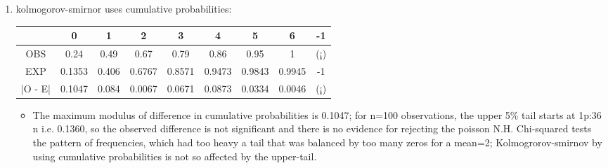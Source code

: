 \documentclass[a4paper,12pt]{article}
\begin{document}
\begin{enumerate}
\item kolmogorov-smirnor uses cumulative probabilities:

\begin{center}
\begin{tabular}{ccccccc|c|c}
	&	0	&	1	&	2	&	3	&	4	&	5	&	6	&	-1	\\ \hline
OBS 	&	0.24	&	0.49	&	0.67	&	0.79	&	0.86	&	0.95	&	1	&	(¡)	\\ \hline
EXP 	&	0.1353	&	0.406	&	0.6767	&	0.8571	&	0.9473	&	0.9843	&	0.9945	&	-1	\\ \hline
|O - E| 	&	0.1047	&	0.084	&	0.0067	&	0.0671	&	0.0873	&	0.0334	&	0.0046	&	(¡)	\\ \hline
\end{tabular}
\end{center}



\begin{itemize}
    \item The maximum modulus of difference in cumulative probabilities is 0.1047; for n=100
observations, the upper 5\% tail starts at 1p:36
n i.e. 0.1360, so the observed difference is
not significant and there is no evidence for rejecting the poisson N.H. Chi-squared tests
the pattern of frequencies, which had too heavy a tail that was balanced by too many
zeros for a mean=2; Kolmogrorov-smirnov by using cumulative probabilities is not so
affected by the upper-tail.

\end{itemize}
 
\end{enumerate}
\end{document}
